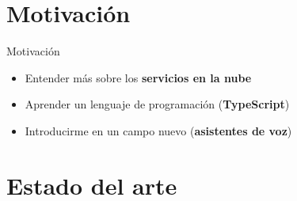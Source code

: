 \documentclass{beamer}
\begin{document}
  \section{Motivación}
  
  \newcommand{\includecenteredgraphicsb}[3][.35]{\raisebox{-#1\height}{\texttt{[image: \#3]}}}
  \newcommand{\includecenteredgraphicsl}[3][.35]{\includecenteredgraphicsb[#1]{#2}{#3}\hspace{.1em}}
  \newcommand{\includecenteredgraphicsr}[3][.35]{\hspace{.1em}\includecenteredgraphicsb[#1]{#2}{#3}}
 
  \begin{frame}{Motivación}
    \begin{itemize}
      \setlength\itemsep{1.5em}
      \item Entender más sobre los \textbf{servicios en la nube}
      \includecenteredgraphicsr{.35}{aws-lambda-logo.png}
      \item Aprender un lenguaje de programación (\textbf{TypeScript})
      \includecenteredgraphicsr{.02}{typescript-logo.png}
      \item Introducirme en un campo nuevo (\textbf{asistentes de voz})
      \includecenteredgraphicsr{1}{amazon-alexa.png}
    \end{itemize}
  \end{frame}

  \section{Estado del arte}
\end{document}
